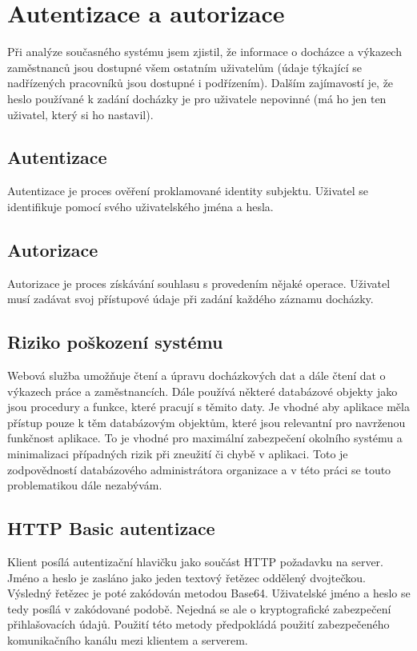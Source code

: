 \documentclass{diplomka}
\begin{document}
\section{Autentizace a autorizace}
Při analýze současného systému jsem zjistil, že informace o docházce a výkazech zaměstnanců jsou dostupné všem ostatním uživatelům (údaje týkající se nadřízených pracovníků jsou dostupné i podřízením). Dalším zajímavostí je, že heslo používané k zadání docházky je pro uživatele nepovinné (má ho jen ten uživatel, který si ho nastavil). 

\subsection*{Autentizace}
Autentizace je proces ověření proklamované identity subjektu. Uživatel se identifikuje pomocí svého uživatelského jména a hesla.

\subsection*{Autorizace}
Autorizace je proces získávání souhlasu s provedením nějaké operace. Uživatel musí zadávat svoj přístupové údaje při zadání každého záznamu docházky. 

\subsection*{Riziko poškození systému}
Webová služba umožňuje čtení a úpravu docházkových dat a dále čtení dat o výkazech práce a zaměstnancích. Dále používá některé databázové objekty jako jsou procedury a funkce, které pracují s těmito daty. Je vhodné aby aplikace měla přístup pouze k těm databázovým objektům, které jsou relevantní pro navrženou funkčnost aplikace. To je vhodné pro maximální zabezpečení okolního systému a minimalizaci případných rizik při zneužití či chybě v aplikaci. Toto je zodpovědností databázového administrátora organizace a v této práci se touto problematikou dále nezabývám.

\subsection*{HTTP Basic autentizace}
Klient posílá autentizační hlavičku jako součást HTTP požadavku na server. Jméno a heslo je zasláno jako jeden textový řetězec oddělený dvojtečkou. Výsledný řetězec je poté zakódován metodou Base64. Uživatelské jméno a heslo se tedy posílá v zakódované podobě. Nejedná se ale o kryptografické zabezpečení přihlašovacích údajů. Použití této metody předpokládá použití zabezpečeného komunikačního kanálu mezi klientem a serverem.
\end{document}
